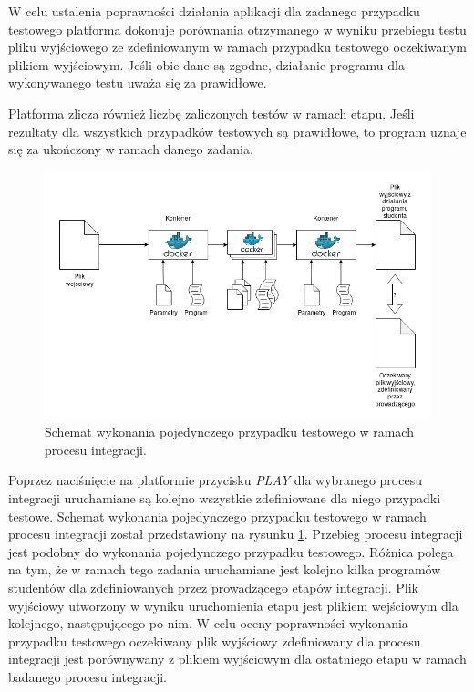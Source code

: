 W celu ustalenia poprawności działania aplikacji dla zadanego przypadku testowego platforma dokonuje porównania otrzymanego w wyniku przebiegu testu pliku wyjściowego ze zdefiniowanym w ramach przypadku testowego oczekiwanym plikiem wyjściowym.
Jeśli obie dane są zgodne, działanie programu dla wykonywanego testu uważa się za prawidłowe.

Platforma zlicza również liczbę zaliczonych testów w ramach etapu.
Jeśli rezultaty dla wszystkich przypadków testowych są prawidłowe, to program uznaje się za ukończony w ramach danego zadania.

\begin{figure}[h]
    \centering
    \includegraphics[width = 12cm]{chapter05/integration.png}
    \caption{Schemat wykonania pojedynczego przypadku testowego w ramach procesu integracji.}
    \label{fig:integration}
\end{figure}

Poprzez naciśnięcie na platformie przycisku \textit{PLAY} dla wybranego procesu integracji uruchamiane są kolejno wszystkie zdefiniowane dla niego przypadki testowe.
Schemat wykonania pojedynczego przypadku testowego w ramach procesu integracji został przedstawiony na rysunku \ref{fig:integration}.
Przebieg procesu integracji jest podobny do wykonania pojedynczego przypadku testowego.
Różnica polega na tym, że w ramach tego zadania uruchamiane jest kolejno kilka programów studentów dla zdefiniowanych przez prowadzącego etapów integracji.
Plik wyjściowy utworzony w wyniku uruchomienia etapu jest plikiem wejściowym dla kolejnego, następującego po nim.
W celu oceny poprawności wykonania przypadku testowego oczekiwany plik wyjściowy zdefiniowany dla procesu integracji jest porównywany z plikiem wyjściowym dla ostatniego etapu w ramach badanego procesu integracji.

